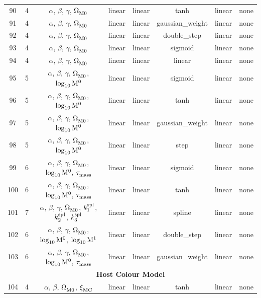 \begin{longtable}{c c c c c c c c}
    \hline
    90 & 4 & $\alpha$, $\beta$, $\gamma$, $\Omega_{\rm M0}^{}$ & linear & linear & tanh & linear & none \\
    91 & 4 & $\alpha$, $\beta$, $\gamma$, $\Omega_{\rm M0}^{}$ & linear & linear & gaussian\_weight & linear & none \\
    92 & 4 & $\alpha$, $\beta$, $\gamma$, $\Omega_{\rm M0}^{}$ & linear & linear & double\_step & linear & none \\
    93 & 4 & $\alpha$, $\beta$, $\gamma$, $\Omega_{\rm M0}^{}$ & linear & linear & sigmoid & linear & none \\
    94 & 4 & $\alpha$, $\beta$, $\gamma$, $\Omega_{\rm M0}^{}$ & linear & linear & linear & linear & none \\
    95 & 5 & $\alpha$, $\beta$, $\gamma$, $\Omega_{\rm M0}^{}$, $\log_{10}^{}{\rm M}^0$ & linear & linear & sigmoid & linear & none \\
    96 & 5 & $\alpha$, $\beta$, $\gamma$, $\Omega_{\rm M0}^{}$, $\log_{10}^{}{\rm M}^0$ & linear & linear & tanh & linear & none \\
    97 & 5 & $\alpha$, $\beta$, $\gamma$, $\Omega_{\rm M0}^{}$, $\log_{10}^{}{\rm M}^0$ & linear & linear & gaussian\_weight & linear & none \\
    98 & 5 & $\alpha$, $\beta$, $\gamma$, $\Omega_{\rm M0}^{}$, $\log_{10}^{}{\rm M}^0$ & linear & linear & step & linear & none \\
    99 & 6 & $\alpha$, $\beta$, $\gamma$, $\Omega_{\rm M0}^{}$, $\log_{10}^{}{\rm M}^0$, $\tau_{\rm mass}^{}$ & linear & linear & sigmoid & linear & none \\
    100 & 6 & $\alpha$, $\beta$, $\gamma$, $\Omega_{\rm M0}^{}$, $\log_{10}^{}{\rm M}^0$, $\tau_{\rm mass}^{}$ & linear & linear & tanh & linear & none \\
    101 & 7 & $\alpha$, $\beta$, $\gamma$, $\Omega_{\rm M0}^{}$, $k_1^{\rm spl}$, $k_2^{\rm spl}$, $k_3^{\rm spl}$ & linear & linear & spline & linear & none \\
    102 & 6 & $\alpha$, $\beta$, $\gamma$, $\Omega_{\rm M0}^{}$, $\log_{10}^{}{\rm M}^0$, $\log_{10}^{}{\rm M}^1$ & linear & linear & double\_step & linear & none \\
    103 & 6 & $\alpha$, $\beta$, $\gamma$, $\Omega_{\rm M0}^{}$, $\log_{10}^{}{\rm M}^0$, $\tau_{\rm mass}^{}$ & linear & linear & gaussian\_weight & linear & none \\
    \hline
    \multicolumn{8}{c}{\textbf{Host Colour Model}} \\
    \hline
    104 & 4 & $\alpha$, $\beta$, $\Omega_{\rm M0}^{}$, $\xi_{\rm MC}^{}$ & linear & linear & tanh & linear & none \\

\end{longtable}
